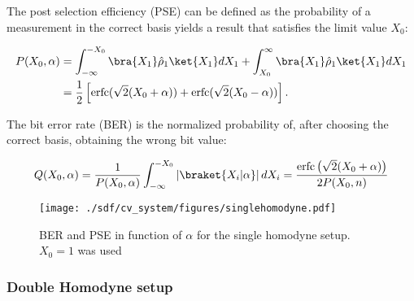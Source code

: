 The post selection efficiency (PSE) can be defined as the probability of a measurement in the correct basis yields a result that satisfies the limit value $X_0$:

\begin{equation}\label{eq:postselecteff}
\begin{aligned}
P(X_0,\alpha)&=\int^{-X_0}_{-\infty}\bra{X_1}\hat{\rho}_1\ket{X_1}dX_1+\int^{\infty}_{X_0}\bra{X_1}\hat{\rho}_1\ket{X_1}dX_1\\
&=\frac{1}{2}\left[\text{erfc}(\sqrt{2}(X_0+\alpha))+\text{erfc}(\sqrt{2}(X_0-\alpha))\right].
\end{aligned}
\end{equation}

The bit error rate (BER) is the normalized probability of, after choosing the correct basis, obtaining the wrong bit value:

\begin{equation}\label{eq:biterrorratio}
Q(X_0,\alpha)=\frac{1}{P(X_0,\alpha)}\int_{-\infty}^{-X_0}\left|\braket{X_i|\alpha}\right|dX_i=\frac{\text{erfc}\left(\sqrt{2}(X_0+\alpha)\right)}{2P(X_0,n)}
\end{equation}

\begin{figure}[h]
\centering
\texttt{[image: ./sdf/cv\_system/figures/singlehomodyne.pdf]}
\caption{BER and PSE in function of $\alpha$ for the single homodyne setup. $X_0=1$ was used}
\label{fig:ber}
\end{figure}



\subsubsection*{Double Homodyne setup}

